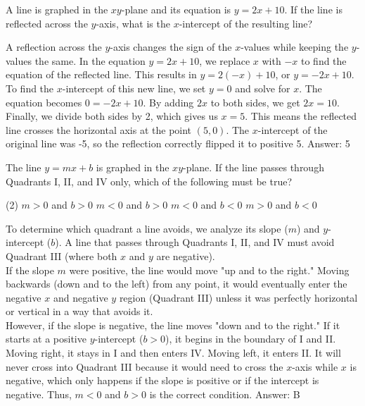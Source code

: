 \documentclass[11pt,paper=a4,answers]{exam}
\begin{document}
\begin{questions}
\question
A line is graphed in the $xy$-plane and its equation is $y = 2x + 10$. If the line is reflected across the $y$-axis, what is the $x$-intercept of the resulting line?

\begin{solution}
A reflection across the $y$-axis changes the sign of the $x$-values while keeping the $y$-values the same. In the equation $y = 2x + 10$, we replace $x$ with $-x$ to find the equation of the reflected line. This results in $y = 2(-x) + 10$, or $y = -2x + 10$.
\\[10pt]
To find the $x$-intercept of this new line, we set $y = 0$ and solve for $x$. The equation becomes $0 = -2x + 10$. By adding $2x$ to both sides, we get $2x = 10$.
\\[10pt]
Finally, we divide both sides by 2, which gives us $x = 5$. This means the reflected line crosses the horizontal axis at the point $(5, 0)$. The $x$-intercept of the original line was -5, so the reflection correctly flipped it to positive 5.
\vspace{15pt}
Answer: \colorbox{yellow!100}{5}
\end{solution}

\question
The line $y = mx + b$ is graphed in the $xy$-plane. If the line passes through Quadrants I, II, and IV only, which of the following must be true?
\begin{tasks}(2)
    \task $m > 0$ and $b > 0$
    \task $m < 0$ and $b > 0$
    \task $m < 0$ and $b < 0$
    \task $m > 0$ and $b < 0$
\end{tasks}

\begin{solution}
To determine which quadrant a line avoids, we analyze its slope ($m$) and $y$-intercept ($b$). A line that passes through Quadrants I, II, and IV must avoid Quadrant III (where both $x$ and $y$ are negative).
\\[10pt]
If the slope $m$ were positive, the line would move "up and to the right." Moving backwards (down and to the left) from any point, it would eventually enter the negative $x$ and negative $y$ region (Quadrant III) unless it was perfectly horizontal or vertical in a way that avoids it. 
\\[10pt]
However, if the slope is negative, the line moves "down and to the right." If it starts at a positive $y$-intercept ($b > 0$), it begins in the boundary of I and II. Moving right, it stays in I and then enters IV. Moving left, it enters II. It will never cross into Quadrant III because it would need to cross the $x$-axis while $x$ is negative, which only happens if the slope is positive or if the intercept is negative. Thus, $m < 0$ and $b > 0$ is the correct condition.
\vspace{15pt}
Answer: \colorbox{yellow!100}{B}
\end{solution}


\end{questions}
\end{document}
